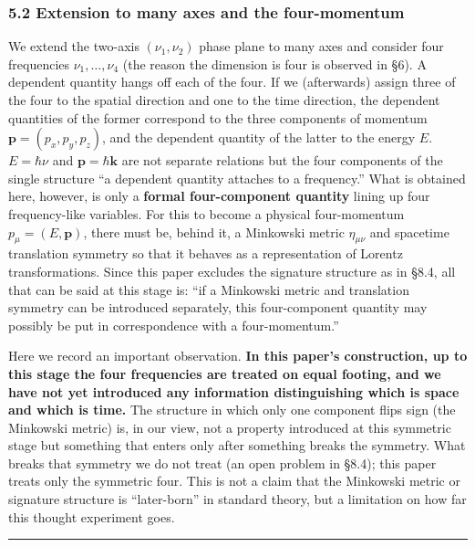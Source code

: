 \documentclass[
]{article}
\begin{document}
\subsubsection{5.2 Extension to many axes and the
four-momentum}\label{extension-to-many-axes-and-the-four-momentum}

We extend the two-axis \((\nu_1,\nu_2)\) phase plane to many axes and
consider four frequencies \(\nu_1,\dots,\nu_4\) (the reason the
dimension is four is observed in §6). A dependent quantity hangs off
each of the four. If we (afterwards) assign three of the four to the
spatial direction and one to the time direction, the dependent
quantities of the former correspond to the three components of momentum
\(\boldsymbol{p}=(p_x,p_y,p_z)\), and the dependent quantity of the
latter to the energy \(E\). \(E=\hbar\nu\) and
\(\boldsymbol{p}=\hbar\boldsymbol{k}\) are not separate relations but
the four components of the single structure ``a dependent quantity
attaches to a frequency.'' What is obtained here, however, is only a
\textbf{formal four-component quantity} lining up four frequency-like
variables. For this to become a physical four-momentum
\(p_\mu=(E,\boldsymbol{p})\), there must be, behind it, a Minkowski
metric \(\eta_{\mu\nu}\) and spacetime translation symmetry so that it
behaves as a representation of Lorentz transformations. Since this paper
excludes the signature structure as in §8.4, all that can be said at
this stage is: ``if a Minkowski metric and translation symmetry can be
introduced separately, this four-component quantity may possibly be put
in correspondence with a four-momentum.''

Here we record an important observation. \textbf{In this paper's
construction, up to this stage the four frequencies are treated on equal
footing, and we have not yet introduced any information distinguishing
which is space and which is time.} The structure in which only one
component flips sign (the Minkowski metric) is, in our view, not a
property introduced at this symmetric stage but something that enters
only after something breaks the symmetry. What breaks that symmetry we
do not treat (an open problem in §8.4); this paper treats only the
symmetric four. This is not a claim that the Minkowski metric or
signature structure is ``later-born'' in standard theory, but a
limitation on how far this thought experiment goes.

\begin{center}\rule{0.5\linewidth}{0.5pt}\end{center}
\end{document}
